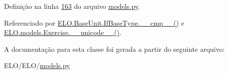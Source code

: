 Definição na linha \hyperlink{ELO_2models_8py_source_l00163}{163} do arquivo \hyperlink{ELO_2models_8py_source}{models.\-py}.



Referenciado por \hyperlink{classELO_1_1BaseUnit_1_1IfBaseType_a69c338f6f1574bd3524e9d59ebc17a7c}{E\-L\-O.\-Base\-Unit.\-If\-Base\-Type.\-\_\-\-\_\-cmp\-\_\-\-\_\-()} e \hyperlink{classELO_1_1models_1_1Exercise_af3e991e5610cec815a2c3260ec6aae0b}{E\-L\-O.\-models.\-Exercise.\-\_\-\-\_\-unicode\-\_\-\-\_\-()}.



A documentação para esta classe foi gerada a partir do seguinte arquivo\-:\begin{DoxyCompactItemize}
\item 
E\-L\-O/\-E\-L\-O/\hyperlink{ELO_2models_8py}{models.\-py}\end{DoxyCompactItemize}

